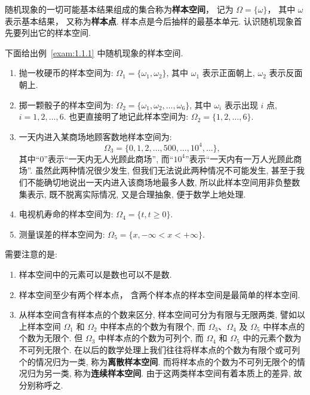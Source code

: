 随机现象的一切可能基本结果组成的集合称为\textbf{样本空间}，
记为 $\Omega = \{\omega\}$，
其中 $\omega$ 表示基本结果，
又称为\textbf{样本点}.
样本点是今后抽样的最基本单元.
认识随机现象首先要列出它的样本空间.

\begin{example}	
	下面给出例~\ref{exam:1.1.1} 中随机现象的样本空间.
	\begin{enumerate}
    \item 抛一枚硬币的样本空间为:
    $\Omega_1 = \{ \omega_1 , \omega_2 \}$,
    其中 $\omega_1$ 表示正面朝上,
    $\omega_2$ 表示反面朝上.
    \item 掷一颗骰子的样本空间为:
    $ \Omega_2 = \{ \omega_1, \omega_2, \dotsc, \omega_6 \} $,
    其中 $ \omega_i $ 表示出现 $ i $ 点,
    $ i = 1,2,\dotsc,6 $.
    也更直接明了地记此样本空间为:
    $ \Omega_2 = \{1,2,\dotsc,6\} $.
		\item 一天内进入某商场地顾客数地样本空间为:
		\[ \Omega_3 = \{0,1,2,\dotsc,500,\dotsc,10^4,\dotsc\},\]
    其中“0”表示“一天内无人光顾此商场”,
    而“$10^4$”表示“一天内有一万人光顾此商场”.
    虽然此两种情况很少发生,
    但我们无法说此两种情况不可能发生,
    甚至于我们不能确切地说出一天内进入该商场地最多人数,
    所以此样本空间用非负整数集表示,
    既不脱离实际情况,
    又是合理抽象,
    便于数学上地处理.
    \item 电视机寿命的样本空间为:
    $ \Omega_4=\{t,t \geq 0\} $.
    \item 测量误差的样本空间为:
    $ \Omega_5=\{x,-\infty < x < +\infty\} $.
	\end{enumerate}
\end{example}

需要注意的是:
\begin{enumerate}
	\item 样本空间中的元素可以是数也可以不是数.
  \item 样本空间至少有两个样本点，
  含两个样本点的样本空间是最简单的样本空间.
  \item 从样本空间含有样本点的个数来区分,
  样本空间可分为有限与无限两类,
  譬如以上样本空间 $\Omega_1$ 和 $\Omega_2$ 中样本点的个数为有限个,
  而 $\Omega_3$、$\Omega_4$ 及 $\Omega_5$ 中样本点的个数为无限个.
  但 $\Omega_3$ 中样本点的个数为可列个,
  而 $\Omega_4$ 和 $\Omega_5$ 中的元素个数为不可列无限个.
  在以后的数学处理上我们往往将样本点的个数为有限个或可列个的情况归为一类,
  称为\textbf{离散样本空间}.
  而将样本点的个数为不可列无限个的情况归为另一类,
  称为\textbf{连续样本空间}.
  由于这两类样本空间有着本质上的差异,
  故分别称呼之.
\end{enumerate}

